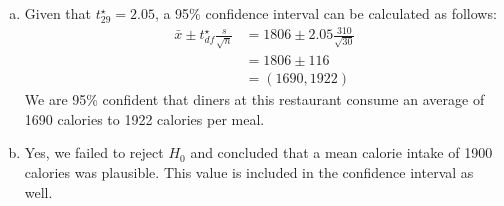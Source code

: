 {{\begin{enumerate}[(a)]
\begin{align*}
0.10 &< p-value < 0.20
\end{align*}
Since p-value $>$ 0.05, we fail to reject $H_0$. The data do not provide strong evidence of a change in the average calorie intake of diners at this restaurant.
\item Given that $t_{29}^\star = 2.05$, a 95\% confidence interval can be calculated as follows:
\begin{align*}
\bar{x} \pm t_{df}^\star \frac{s}{\sqrt{n}} &= 1806 \pm 2.05 \frac{310}{\sqrt{30}} \\
&= 1806 \pm 116 \\
&= (1690, 1922)
\end{align*}
We are 95\% confident that diners at this restaurant consume an average of 1690 calories to 1922 calories per meal.
\item Yes, we failed to reject $H_0$ and concluded that a mean calorie intake of 1900 calories was plausible. This value is included in the confidence interval as well.
\end{enumerate}
}
}


